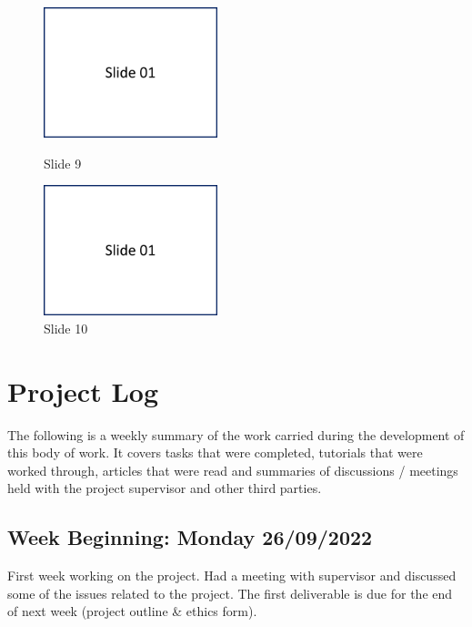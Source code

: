\begin{figure}[H]
\parbox{74.mm}{
    \centering
    \includegraphics[width=0.45\textwidth,page=9]{appendix/images/PresentationSlides}
    \caption*{Slide 9}
}
    \parbox{74.mm}{
    \centering
    \includegraphics[width=0.45\textwidth,page=10]{appendix/images/PresentationSlides}
    \caption*{Slide 10}
}
\end{figure}

\chapter{Project Log}

The following is a weekly summary of the work carried during the development of this body of work. It covers tasks that were completed, tutorials that were worked through, articles that were read and summaries of discussions / meetings held with the project supervisor and other third parties. 

\section*{Week Beginning: Monday 26/09/2022}

First week working on the project. Had a meeting with supervisor and discussed some of the issues related to the project. The first deliverable is due for the end of next week (project outline \& ethics form). 

